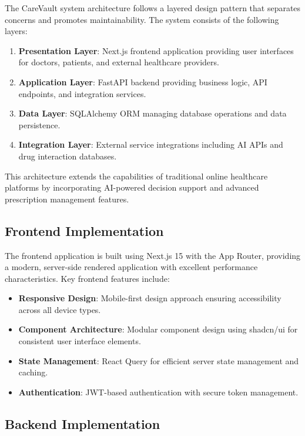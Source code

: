 \documentclass[12pt,a4paper]{article}
\begin{document}
The CareVault system architecture follows a layered design pattern that separates concerns and promotes maintainability. The system consists of the following layers:

\begin{enumerate}
    \item \textbf{Presentation Layer}: Next.js frontend application providing user interfaces for doctors, patients, and external healthcare providers.
    \item \textbf{Application Layer}: FastAPI backend providing business logic, API endpoints, and integration services.
    \item \textbf{Data Layer}: SQLAlchemy ORM managing database operations and data persistence.
    \item \textbf{Integration Layer}: External service integrations including AI APIs and drug interaction databases.
\end{enumerate}

This architecture extends the capabilities of traditional online healthcare platforms by incorporating AI-powered decision support and advanced prescription management features.

\subsection{Frontend Implementation}

The frontend application is built using Next.js 15 with the App Router, providing a modern, server-side rendered application with excellent performance characteristics. Key frontend features include:

\begin{itemize}
    \item \textbf{Responsive Design}: Mobile-first design approach ensuring accessibility across all device types.
    \item \textbf{Component Architecture}: Modular component design using shadcn/ui for consistent user interface elements.
    \item \textbf{State Management}: React Query for efficient server state management and caching.
    \item \textbf{Authentication}: JWT-based authentication with secure token management.
\end{itemize}

\subsection{Backend Implementation}
\end{document}
